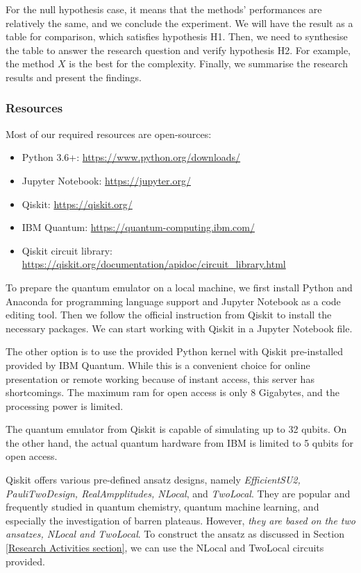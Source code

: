 For the null hypothesis case, it means that the methods' performances are relatively the same, and we conclude the experiment.
We will have the result as a table for comparison, which satisfies hypothesis H1.
Then, we need to synthesise the table to answer the research question and verify hypothesis H2.
For example, the method $X$ is the best for the complexity.
Finally, we summarise the research results and present the findings.

\subsubsection{Resources}
Most of our required resources are open-sources:
\begin{itemize}
    \item Python 3.6+: \url{https://www.python.org/downloads/}
    \item Jupyter Notebook: \url{https://jupyter.org/}
    \item Qiskit: \url{https://qiskit.org/}
    \item IBM Quantum: \url{https://quantum-computing.ibm.com/}
    \item Qiskit circuit library: \url{https://qiskit.org/documentation/apidoc/circuit_library.html}
\end{itemize}

To prepare the quantum emulator on a local machine, we first install Python and Anaconda for programming language support and Jupyter Notebook as a code editing tool.
Then we follow the official instruction from Qiskit \cite{Qiskit} to install the necessary packages.
We can start working with Qiskit in a Jupyter Notebook file.

The other option is to use the provided Python kernel with Qiskit pre-installed provided by IBM Quantum.
While this is a convenient choice for online presentation or remote working because of instant access, this server has shortcomings.
The maximum ram for open access is only 8 Gigabytes, and the processing power is limited.

The quantum emulator from Qiskit is capable of simulating up to 32 qubits.
On the other hand, the actual quantum hardware from IBM is limited to 5 qubits for open access.

Qiskit offers various pre-defined ansatz designs, namely \textit{EfficientSU2, PauliTwoDesign, RealAmpplitudes, NLocal}, and \textit{TwoLocal}.
They are popular and frequently studied in quantum chemistry, quantum machine learning, and especially the investigation of barren plateaus.
However, \emph{they are based on the two ansatzes, NLocal and TwoLocal}.
To construct the ansatz as discussed in Section \ref{Research Activities section}, we can use the NLocal and TwoLocal circuits provided.


